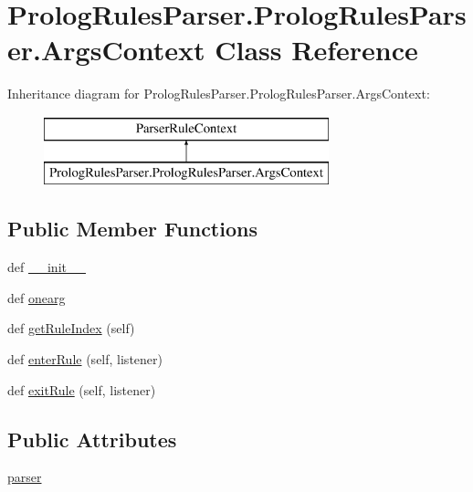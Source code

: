\hypertarget{class_prolog_rules_parser_1_1_prolog_rules_parser_1_1_args_context}{}\section{Prolog\+Rules\+Parser.\+Prolog\+Rules\+Parser.\+Args\+Context Class Reference}
\label{class_prolog_rules_parser_1_1_prolog_rules_parser_1_1_args_context}
Inheritance diagram for Prolog\+Rules\+Parser.\+Prolog\+Rules\+Parser.\+Args\+Context\+:\begin{figure}[H]
\begin{center}
\leavevmode
\includegraphics[height=2.000000cm]{class_prolog_rules_parser_1_1_prolog_rules_parser_1_1_args_context}
\end{center}
\end{figure}
\subsection*{Public Member Functions}
\begin{DoxyCompactItemize}
\item 
def \hyperlink{class_prolog_rules_parser_1_1_prolog_rules_parser_1_1_args_context_a92922f84a340c490b424581280adc314}{\+\_\+\+\_\+init\+\_\+\+\_\+}
\item 
def \hyperlink{class_prolog_rules_parser_1_1_prolog_rules_parser_1_1_args_context_acf6c63aed1cdaf0db3191d2ba1350bca}{onearg}
\item 
def \hyperlink{class_prolog_rules_parser_1_1_prolog_rules_parser_1_1_args_context_a2a9420b4abb263666018a5dc664476b3}{get\+Rule\+Index} (self)
\item 
def \hyperlink{class_prolog_rules_parser_1_1_prolog_rules_parser_1_1_args_context_a4a980aace602a76508d43a6aabdd927c}{enter\+Rule} (self, listener)
\item 
def \hyperlink{class_prolog_rules_parser_1_1_prolog_rules_parser_1_1_args_context_abad9fd1b2685f5e8002537178b1bde68}{exit\+Rule} (self, listener)
\end{DoxyCompactItemize}
\subsection*{Public Attributes}
\begin{DoxyCompactItemize}
\item 
\hyperlink{class_prolog_rules_parser_1_1_prolog_rules_parser_1_1_args_context_ad3fbe43f28dfe195ab66b4bb598a7a46}{parser}
\end{DoxyCompactItemize}


